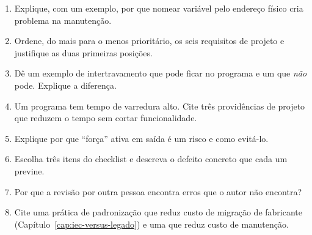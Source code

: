 \begin{exercicios}
\begin{enumerate}[label=\alph*)]
  \item Explique, com um exemplo, por que nomear variável pelo endereço físico cria problema na
        manutenção.
  \item Ordene, do mais para o menos prioritário, os seis requisitos de projeto e justifique as duas
        primeiras posições.
  \item Dê um exemplo de intertravamento que pode ficar no programa e um que \emph{não} pode.
        Explique a diferença.
  \item Um programa tem tempo de varredura alto. Cite três providências de projeto que reduzem o
        tempo sem cortar funcionalidade.
  \item Explique por que ``força'' ativa em saída é um risco e como evitá-lo.
  \item Escolha três itens do checklist e descreva o defeito concreto que cada um previne.
  \item Por que a revisão por outra pessoa encontra erros que o autor não encontra?
  \item Cite uma prática de padronização que reduz custo de migração de fabricante
        (Capítulo~\ref{cap:iec-versus-legado}) e uma que reduz custo de manutenção.
\end{enumerate}
\end{exercicios}

